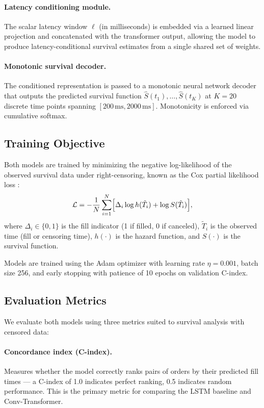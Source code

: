 \documentclass[12pt]{article}
\begin{document}
\paragraph{Latency conditioning module.} The scalar latency window $\ell$ (in milliseconds) is embedded via a learned linear projection and concatenated with the transformer output, allowing the model to produce latency-conditional survival estimates from a single shared set of weights.

\paragraph{Monotonic survival decoder.} The conditioned representation is passed to a monotonic neural network decoder that outputs the predicted survival function $\hat{S}(t_1), \ldots, \hat{S}(t_K)$ at $K = 20$ discrete time points spanning $[200\,\text{ms}, 2000\,\text{ms}]$. Monotonicity is enforced via cumulative softmax.

\subsection{Training Objective}

Both models are trained by minimizing the negative log-likelihood of the observed survival data under right-censoring, known as the Cox partial likelihood loss \citep{cox1972}:
\begin{equation}
  \mathcal{L} = -\frac{1}{N} \sum_{i=1}^{N} \Bigl[\Delta_i \log h(\tilde{T}_i) + \log S(\tilde{T}_i)\Bigr],
\end{equation}
where $\Delta_i \in \{0,1\}$ is the fill indicator (1 if filled, 0 if canceled), $\tilde{T}_i$ is the observed time (fill or censoring time), $h(\cdot)$ is the hazard function, and $S(\cdot)$ is the survival function.

Models are trained using the Adam optimizer with learning rate $\eta = 0.001$, batch size 256, and early stopping with patience of 10 epochs on validation C-index.

\subsection{Evaluation Metrics}

We evaluate both models using three metrics suited to survival analysis with censored data:

\paragraph{Concordance index (C-index).} Measures whether the model correctly ranks pairs of orders by their predicted fill times --- a C-index of 1.0 indicates perfect ranking, 0.5 indicates random performance. This is the primary metric for comparing the LSTM baseline and Conv-Transformer.
\end{document}
